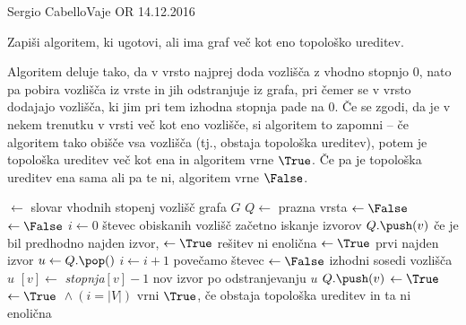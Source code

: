 \begin{naloga}{Sergio Cabello}{Vaje OR 14.12.2016}
\begin{vprasanje}
Zapiši algoritem, ki ugotovi, ali ima graf več kot eno topološko ureditev.
\end{vprasanje}

\begin{odgovor}
Algoritem deluje tako,
da v vrsto najprej doda vozlišča z vhodno stopnjo $0$,
nato pa pobira vozlišča iz vrste in jih odstranjuje iz grafa,
pri čemer se v vrsto dodajajo vozlišča,
ki jim pri tem izhodna stopnja pade na $0$.
Če se zgodi, da je v nekem trenutku v vrsti več kot eno vozlišče,
si algoritem to zapomni
-- če algoritem tako obišče vsa vozlišča
(tj., obstaja topološka ureditev),
potem je topološka ureditev več kot ena in algoritem vrne $\True$.
Če pa je topološka ureditev ena sama ali pa te ni,
algoritem vrne $\False$.
\begin{small}
\begin{algorithmic}
	 $\gets$ slovar vhodnih stopenj vozlišč grafa $G$
	\State $Q \gets$ prazna vrsta
	 $\gets \False$
	 $\gets \False$
	\State $i \gets 0$ \hfill števec obiskanih vozlišč
	 \hfill začetno iskanje izvorov
	        \State $Q.\push(v)$
	         \hfill če je bil predhodno najden izvor,
	             $\gets \True$ \hfill rešitev ni enolična
	        \Else
	             $\gets \True$ \hfill prvi najden izvor
	        \EndIf
	    \EndIf
	\EndFor
	    \State $u \gets Q.\pop()$
	    \State $i \gets i+1$ \hfill povečamo števec
	     $\gets \False$
	     \hfill izhodni sosedi vozlišča $u$
	        $[v] \gets$ {\sl stopnja}$[v] - 1$
	         \hfill nov izvor po odstranjevanju $u$
		        \State $Q.\push(v)$
		             $\gets \True$
		        \Else
		             $\gets \True$
		        \EndIf
	        \EndIf
	    \EndFor
	\EndWhile
	\State {}${} \land (i = |V|)$ \hfill vrni $\True$, če obstaja topološka ureditev in ta ni enolična
\EndFunction
\end{algorithmic}
\end{small}
\end{odgovor}
\end{naloga}

